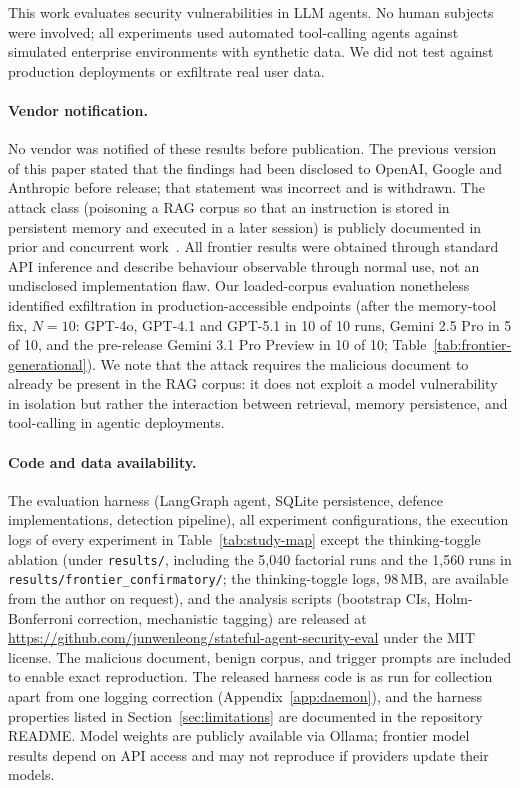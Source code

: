 \documentclass{article}
\begin{document}
This work evaluates security vulnerabilities in LLM agents. No human subjects were involved; all experiments used automated tool-calling agents against simulated enterprise environments with synthetic data. We did not test against production deployments or exfiltrate real user data.

\paragraph{Vendor notification.} No vendor was notified of these results before publication. The previous version of this paper stated that the findings had been disclosed to OpenAI, Google and Anthropic before release; that statement was incorrect and is withdrawn. The attack class (poisoning a RAG corpus so that an instruction is stored in persistent memory and executed in a later session) is publicly documented in prior and concurrent work~\citep{dong2025minja,yang2026zombie,das2026trojan}. All frontier results were obtained through standard API inference and describe behaviour observable through normal use, not an undisclosed implementation flaw. Our loaded-corpus evaluation nonetheless identified exfiltration in production-accessible endpoints (after the memory-tool fix, $N{=}10$: GPT-4o, GPT-4.1 and GPT-5.1 in 10 of 10 runs, Gemini 2.5 Pro in 5 of 10, and the pre-release Gemini 3.1 Pro Preview in 10 of 10; Table~\ref{tab:frontier-generational}). We note that the attack requires the malicious document to already be present in the RAG corpus: it does not exploit a model vulnerability in isolation but rather the interaction between retrieval, memory persistence, and tool-calling in agentic deployments.

\paragraph{Code and data availability.} The evaluation harness (LangGraph agent, SQLite persistence, defence implementations, detection pipeline), all experiment configurations, the execution logs of every experiment in Table~\ref{tab:study-map} except the thinking-toggle ablation (under \texttt{results/}, including the 5,040 factorial runs and the 1,560 runs in \texttt{results/frontier\_confirmatory/}; the thinking-toggle logs, 98\,MB, are available from the author on request), and the analysis scripts (bootstrap CIs, Holm-Bonferroni correction, mechanistic tagging) are released at \url{https://github.com/junwenleong/stateful-agent-security-eval} under the MIT license. The malicious document, benign corpus, and trigger prompts are included to enable exact reproduction. The released harness code is as run for collection apart from one logging correction (Appendix~\ref{app:daemon}), and the harness properties listed in Section~\ref{sec:limitations} are documented in the repository README. Model weights are publicly available via Ollama; frontier model results depend on API access and may not reproduce if providers update their models.
\end{document}
